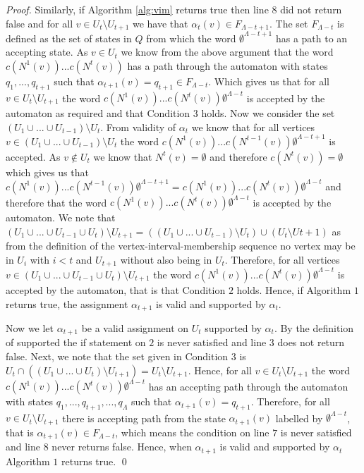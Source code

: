 \documentclass[runningheads]{llncs}
\begin{document}
\begin{toappendix}
\begin{proof}
Similarly, if Algorithm \ref{alg:vim} returns true then line $8$ did not return false and for all $v\in U_t \setminus U_{t+1}$ we have that $\alpha_t(v) \in F_{\Lambda-t+1}$. The set $F_{\Lambda-t}$ is defined as the set of states in $Q$ from which the word $\emptyset^{\Lambda-t+1}$ has a path to an accepting state. As $v \in U_t$ we know from the above argument that the word $c(N^1(v))...c(N^{t}(v))$ has a path through the automaton with states $q_1,...,q_{t+1}$ such that $\alpha_{t+1}(v)=q_{t+1} \in F_{\Lambda-t}$. 
Which gives us that for all $v \in U_t \setminus U_{t+1}$ the word $c(N^1(v))...c(N^{t}(v))\emptyset^{\Lambda-t}$ is accepted by the automaton  as required and that Condition $3$ holds.
Now we consider the set $(U_1 \cup ... \cup U_{t-1}) \setminus U_t$.
From validity of $\alpha_t$ we know that for all vertices $v \in (U_1 \cup ... \cup U_{t-1}) \setminus U_t$ the word $c(N^1(v))...c(N^{t-1}(v))\emptyset^{\Lambda-t+1}$ is accepted. As $v \notin U_t$ we know that $N^t(v)=\emptyset$ and therefore $c(N^t(v))=\emptyset$ which gives us that $c(N^1(v))...c(N^{t-1}(v))\emptyset^{\Lambda-t+1}=c(N^1(v))...c(N^t(v))\emptyset^{\Lambda-t}$ and therefore that the word $c(N^1(v))...c(N^t(v))\emptyset^{\Lambda-t}$ is accepted by the automaton.
We note that $(U_1 \cup ... \cup U_{t-1} \cup U_t)\setminus U_{t+1} = ((U_1 \cup ... \cup U_{t-1}) \setminus U_t) \cup (U_t \setminus U{t+1})$ as from the definition of the vertex-interval-membership sequence no vertex may be in $U_i$ with $i<t$ and $U_{t+1}$ without also being in $U_t$. Therefore, for all vertices $v \in (U_1 \cup ... \cup U_{t-1} \cup U_t)\setminus U_{t+1}$ the word $c(N^1(v))...c(N^t(v))\emptyset^{\Lambda-t}$ is accepted by the automaton, that is that Condition $2$ holds.
Hence, if Algorithm $1$ returns true, the assignment $\alpha_{t+1}$ is valid and supported by $\alpha_t$.

Now we let $\alpha_{t+1}$ be a valid assignment on $U_t$ supported by $\alpha_t$. By the definition of supported the if statement on $2$ is never satisfied and line $3$ does not return false. 
Next, we note that the set given in Condition $3$ is $U_t \cap ((U_1 \cup... \cup U_t)\setminus U_{t+1})=U_t \setminus U_{t+1}$. Hence, for all $v \in U_t \setminus U_{t+1}$ the word $c(N^1(v))...c(N^{t}(v))\emptyset^{\Lambda-t}$ has an accepting path through the automaton with states $q_1,...,q_{t+1},...,q_\Lambda$ such that $\alpha_{t+1}(v)=q_{t+1}$. Therefore, for all $v \in U_t \setminus U_{t+1}$ there is accepting path from the state $\alpha_{t+1}(v)$ labelled by $\emptyset^{\Lambda-t}$, that is $\alpha_{t+1}(v) \in F_{\Lambda-t}$, which means the condition on line $7$ is never satisfied and line $8$ never returns false. Hence, when $\alpha_{t+1}$ is valid and supported by $\alpha_t$ Algorithm $1$ returns true.
\qed \end{proof}



\end{toappendix}
\end{document}
